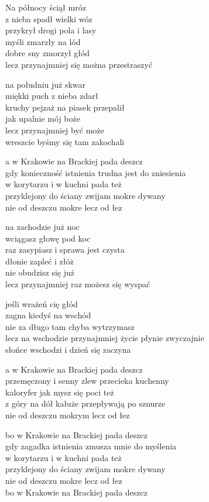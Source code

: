 \begin{text}
    \small{
    Na północy ściął mróz\\
    z nieba spadł wielki wóz\\
    przykrył drogi pola i lasy\\
    myśli zmarzły na lód\\
    dobre sny zmorzył głód\\
    lecz przynajmniej się można przestraszyć

    na południu już skwar\\
    miękki puch z nieba zdarł\\
    kruchy pejzaż na piasek przepalił\\
    jak upalnie mój boże\\
    lecz przynajmniej być może\\
    wreszcie byśmy się tam zakochali

    a w Krakowie na Brackiej pada deszcz\\
    gdy konieczność istnienia trudna jest do zniesienia\\
    w korytarzu i w kuchni pada też\\
    przyklejony do ściany zwijam mokre dywany\\
    nie od deszczu mokre lecz od łez

    na zachodzie już noc\\
    wciągasz głowę pod koc\\
    raz zasypiasz i sprawa jest czysta\\
    dłonie zapleć i złóż\\
    nie obudzisz się już\\
    lecz przynajmniej raz możesz się wyspać

    jeśli wrażeń cię głód\\
    zagna kiedyś na wschód\\
    nie za długo tam chyba wytrzymasz\\
    lecz na wschodzie przynajmniej życie płynie zwyczajnie\\
    słońce wschodzi i dzień się zaczyna

    a w Krakowie na Brackiej pada deszcz\\
    przemęczony i senny zlew przecieka kuchenny\\
    kaloryfer jak mysz się poci też\\
    z góry na dół kałuże przepływają po sznurze\\
    nie od deszczu mokrym lecz od łez

    bo w Krakowie na Brackiej pada deszcz\\
    gdy zagadka istnienia zmusza mnie do myślenia\\
    w korytarzu i w kuchni pada też\\
    przyklejony do ściany zwijam mokre dywany\\
    nie od deszczu mokre lecz od łez\\
    bo w Krakowie na Brackiej pada deszcz
    }
\end{text}
